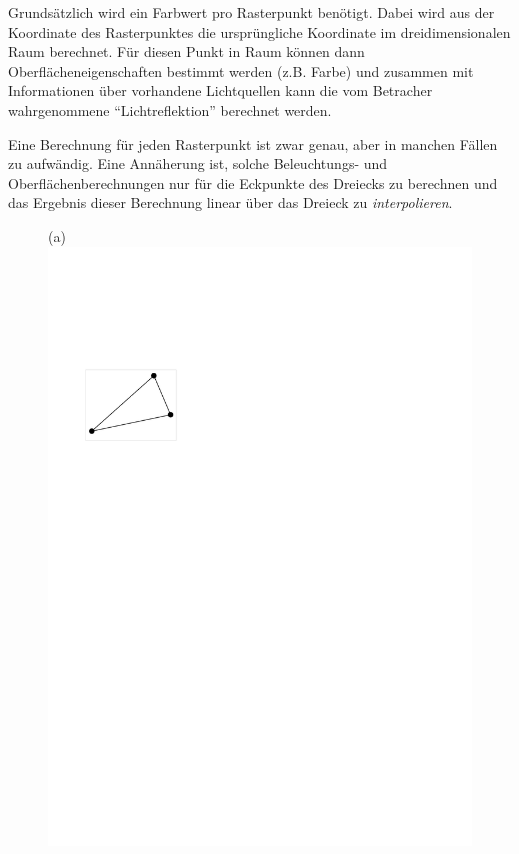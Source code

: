 \documentclass[twoside,a4paper,fleqn,12pt]{book}
\begin{document}
Grundsätzlich wird ein Farbwert pro Rasterpunkt benötigt. Dabei wird aus der Koordinate des Rasterpunktes die ursprüngliche Koordinate
im dreidimensionalen Raum berechnet. Für diesen Punkt in Raum können dann Oberflächeneigenschaften bestimmt werden
(z.B. Farbe) und zusammen mit Informationen über vorhandene Lichtquellen kann die vom Betracher wahrgenommene 
"`Lichtreflektion"' berechnet werden.

Eine Berechnung für jeden Rasterpunkt ist zwar genau, aber in manchen Fällen zu aufwändig. Eine Annäherung ist,
solche Beleuchtungs- und Oberflächenberechnungen nur für die Eckpunkte des Dreiecks zu berechnen und das Ergebnis
dieser Berechnung linear über das Dreieck zu \emph{interpolieren}.

\begin{figure}[h]
  \centering
  (a) \includegraphics[scale=0.8]{triraster1}
  \qquad

\end{figure}
\end{document}
